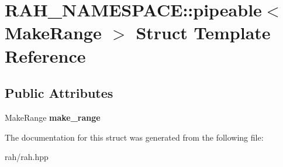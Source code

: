 \hypertarget{struct_r_a_h___n_a_m_e_s_p_a_c_e_1_1pipeable}{}\section{R\+A\+H\+\_\+\+N\+A\+M\+E\+S\+P\+A\+CE\+::pipeable$<$ Make\+Range $>$ Struct Template Reference}
\label{struct_r_a_h___n_a_m_e_s_p_a_c_e_1_1pipeable}
\subsection*{Public Attributes}
\begin{DoxyCompactItemize}
\item 
\mbox{\label{struct_r_a_h___n_a_m_e_s_p_a_c_e_1_1pipeable_a8ddd01c23e163d214268eef1e2ade808}} 
Make\+Range {\bfseries make\+\_\+range}
\end{DoxyCompactItemize}


The documentation for this struct was generated from the following file\+:\begin{DoxyCompactItemize}
\item 
rah/rah.\+hpp\end{DoxyCompactItemize}

